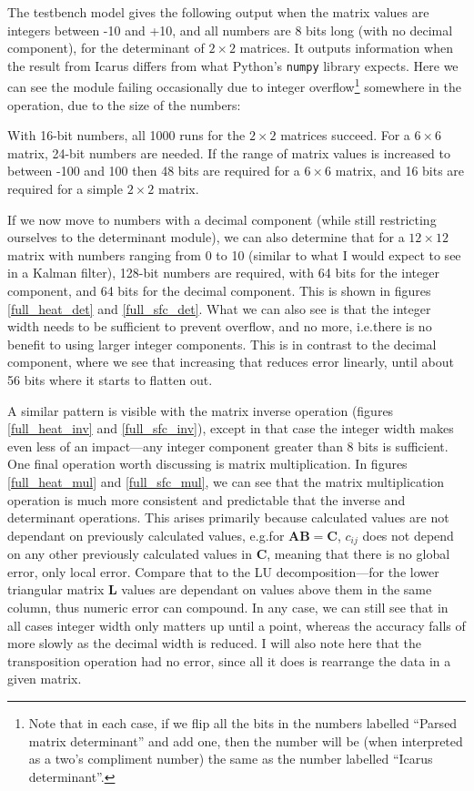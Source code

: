 \documentclass[12pt]{article}
\begin{document}
The testbench model gives the following output when the matrix values are integers between -10 and +10, and all numbers are 8 bits long (with no decimal component), for the determinant of $2\times2$ matrices. It outputs information when the result from Icarus differs from what Python's \lstinline|numpy| library expects. Here we can see the module failing occasionally due to integer overflow\footnote{Note that in each case, if we flip all the bits in the numbers labelled ``Parsed matrix determinant'' and add one, then the number will be (when interpreted as a two's compliment number) the same as the number labelled ``Icarus determinant''.} somewhere in the operation, due to the size of the numbers:

With 16-bit numbers, all 1000 runs for the $2\times2$ matrices succeed. For a $6\times6$ matrix, 24-bit numbers are needed. If the range of matrix values is increased to between -100 and 100 then 48 bits are required for a $6\times6$ matrix, and 16 bits are required for a simple $2\times2$ matrix.

If we now move to numbers with a decimal component (while still restricting ourselves to the determinant module), we can also determine that for a $12\times12$ matrix with numbers ranging from 0 to 10 (similar to what I would expect to see in a Kalman filter), 128-bit numbers are required, with 64 bits for the integer component, and 64 bits for the decimal component. This is shown in figures \ref{full_heat_det} and \ref{full_sfc_det}. What we can also see is that the integer width needs to be sufficient to prevent overflow, and no more, i.e.\@ there is no benefit to using larger integer components. This is in contrast to the decimal component, where we see that increasing that reduces error linearly, until about 56 bits where it starts to flatten out.

A similar pattern is visible with the matrix inverse operation (figures \ref{full_heat_inv} and \ref{full_sfc_inv}), except in that case the integer width makes even less of an impact---any integer component greater than 8 bits is sufficient. One final operation worth discussing is matrix multiplication. In figures \ref{full_heat_mul} and \ref{full_sfc_mul}, we can see that the matrix multiplication operation is much more consistent and predictable that the inverse and determinant operations. This arises primarily because calculated values are not dependant on previously calculated values, e.g.\@ for $\mathbf{AB}=\mathbf{C}$, $c_{ij}$ does not depend on any other previously calculated values in $\mathbf{C}$, meaning that there is no global error, only local error. Compare that to the LU decomposition---for the lower triangular matrix $\mathbf{L}$ values are dependant on values above them in the same column, thus numeric error can compound. In any case, we can still see that in all cases integer width only matters up until a point, whereas the accuracy falls of more slowly as the decimal width is reduced. I will also note here that the transposition operation had no error, since all it does is rearrange the data in a given matrix.
\end{document}
